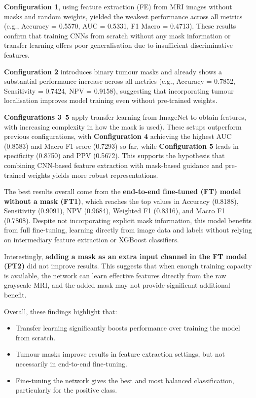 \documentclass[12pt, a4paper]{report}
\begin{document}
\textbf{Configuration 1}, using feature extraction (FE) from MRI images without masks and random weights, yielded the weakest performance across all metrics (e.g., Accuracy = 0.5570, AUC = 0.5331, F1 Macro = 0.4713). These results confirm that training CNNs from scratch without any mask information or transfer learning offers poor generalisation due to insufficient discriminative features.

\textbf{Configuration 2} introduces binary tumour masks and already shows a substantial performance increase across all metrics (e.g., Accuracy = 0.7852, Sensitivity = 0.7424, NPV = 0.9158), suggesting that incorporating tumour localisation improves model training even without pre-trained weights.

\textbf{Configurations 3–5} apply transfer learning from ImageNet to obtain features, with increasing complexity in how the mask is used). These setups outperform previous configurations, with \textbf{Configuration 4} achieving the highest AUC (0.8583) and Macro F1-score (0.7293) so far, while \textbf{Configuration 5} leads in specificity (0.8750) and PPV (0.5672). This supports the hypothesis that combining CNN-based feature extraction with mask-based guidance and pre-trained weights yields more robust representations.

The best results overall come from the \textbf{end-to-end fine-tuned (FT) model without a mask (FT1)}, which reaches the top values in Accuracy (0.8188), Sensitivity (0.9091), NPV (0.9684), Weighted F1 (0.8316), and Macro F1 (0.7808). Despite not incorporating explicit mask information, this model benefits from full fine-tuning, learning directly from image data and labels without relying on intermediary feature extraction or XGBoost classifiers.

Interestingly, \textbf{adding a mask as an extra input channel in the FT model (FT2)} did not improve results. This suggests that when enough training capacity is available, the network can learn effective features directly from the raw grayscale MRI, and the added mask may not provide significant additional benefit.

Overall, these findings highlight that:
\begin{itemize}
    \item Transfer learning significantly boosts performance over training the model from scratch.
    \item Tumour masks improve results in feature extraction settings, but not necessarily in end-to-end fine-tuning.
    \item Fine-tuning the network gives the best and most balanced classification, particularly for the positive class.
\end{itemize}
\end{document}
